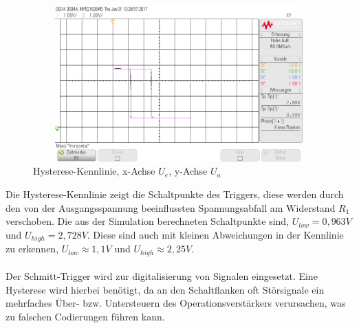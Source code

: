 \begin{figure}[H]
 \begin{center}
  \includegraphics[height=6cm,width=12cm]{OsziBilder/SchmittTrigger_XY}
 \end{center}
 \caption{Hysterese-Kennlinie, x-Achse $U_e$, y-Achse $U_a$}
\end{figure}
\noindent
Die Hysterese-Kennlinie zeigt die Schaltpunkte des Triggers, diese werden durch den von der
Ausgangsspannung beeinflussten Spannungsabfall am Widerstand $R_1$ verschoben. Die aus der Simulation
berechneten Schaltpunkte sind, $U_{low}=0,963V$ und $U_{high}=2,728V$. Diese sind auch mit kleinen
Abweichungen in der Kennlinie zu erkennen, $U_{low}\approx 1,1V$ und $U_{high}\approx 2,25V$.\\
\\
Der Schmitt-Trigger wird zur digitalisierung von Signalen eingesetzt. Eine Hysterese wird hierbei benötigt,
da an den Schaltflanken oft Störsignale ein mehrfaches Über- bzw. Untersteuern des Operationsverstärkers verursachen, was
zu falschen Codierungen führen kann.
